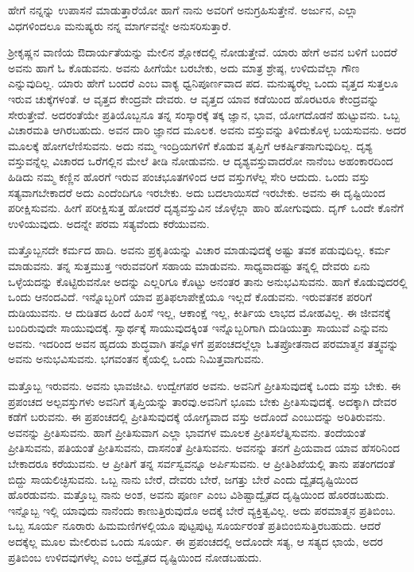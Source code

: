 \begin{artha}
ಹೇಗೆ ನನ್ನನ್ನು ಉಪಾಸನೆ ಮಾಡುತ್ತಾರೆಯೋ ಹಾಗೆ ನಾನು ಅವರಿಗೆ ಅನುಗ್ರಹಿಸುತ್ತೇನೆ. ಅರ್ಜುನ, ಎಲ್ಲಾ ವಿಧಗಳಿಂದಲೂ ಮನುಷ್ಯರು ನನ್ನ ಮಾರ್ಗವನ್ನೇ ಅನುಸರಿಸುತ್ತಾರೆ.
\end{artha}

ಶ‍್ರೀಕೃಷ್ಣನ ವಾಣಿಯ ಔದಾರ್ಯತೆಯನ್ನು ಮೇಲಿನ ಶ್ಲೋಕದಲ್ಲಿ ನೋಡುತ್ತೇವೆ. ಯಾರು ಹೇಗೆ ಅವನ ಬಳಿಗೆ ಬಂದರೆ ಅವನು ಹಾಗೆ ಓ ಕೊಡುವನು. ಅವನು ಹೀಗೆಯೇ ಬರಬೇಕು, ಅದು ಮಾತ್ರ ಶ್ರೇಷ್ಠ, ಉಳಿದುವೆಲ್ಲಾ ಗೌಣ ಎನ್ನುವುದಿಲ್ಲ. ಯಾರು ಹೇಗೆ ಬಂದರೆ ಎಂಬ ವಾಕ್ಯ ಧ್ವನಿಪೂರ್ಣವಾದ ಪದ. ಮನುಷ್ಯರೆಲ್ಲ ಒಂದು ವೃತ್ತದ ಸುತ್ತಲೂ ಇರುವ ಚುಕ್ಕೆಗಳಂತೆ. ಆ ವೃತ್ತದ ಕೇಂದ್ರವೇ ದೇವರು. ಆ ವೃತ್ತದ ಯಾವ ಕಡೆಯಿಂದ ಹೊರಟರೂ ಕೇಂದ್ರವನ್ನು ಸೇರುತ್ತೇವೆ. ಅದರಂತೆಯೇ ಪ್ರತಿಯೊಬ್ಬನೂ ತನ್ನ ಸಂಸ್ಕಾರಕ್ಕೆ ತಕ್ಕ ಜ್ಞಾನ, ಭಾವ, ಯೋಗದೊಡನೆ ಹುಟ್ಟುವನು. ಒಬ್ಬ ವಿಚಾರಮತಿ ಆಗಿರಬಹುದು. ಅವನ ದಾರಿ ಜ್ಞಾನದ ಮೂಲಕ. ಅವನು ವಸ್ತುವನ್ನು ತಿಳಿದುಕೊಳ್ಳ ಬಯಸುವನು. ಅದರ ಮೂಲಕ್ಕೆ ಹೋಗಲೆಣಿಸುವನು. ಅದು ನಮ್ಮ ಇಂದ್ರಿಯಗಳಿಗೆ ಕೊಡುವ ತೃಪ್ತಿಗೆ ಆಕರ್ಷಿತನಾಗುವುದಿಲ್ಲ. ದೃಶ್ಯ ವಸ್ತುವನ್ನೆಲ್ಲ ವಿಚಾರದ ಒರೆಗಲ್ಲಿನ ಮೇಲೆ ತೀಡಿ ನೋಡುವನು. ಆ ದೃಶ್ಯವಸ್ತುವಾದರೋ ನಾನೆಂಬ ಅಹಂಕಾರದಿಂದ ಹಿಡಿದು ನಮ್ಮ ಕಣ್ಣಿನ ಹೊರಗೆ ಇರುವ ಪಂಚಭೂತಗಳಿಂದ ಆದ ವಸ್ತುಗಳೆಲ್ಲ ಸೇರಿ ಆದುದು. ಒಂದು ವಸ್ತು ಸತ್ಯವಾಗಬೇಕಾದರೆ ಅದು ಎಂದೆಂದಿಗೂ ಇರಬೇಕು. ಅದು ಬದಲಾಯಿಸದೆ ಇರಬೇಕು. ಅವನು ಈ ದೃಷ್ಟಿಯಿಂದ ಪರೀಕ್ಷಿಸುವನು. ಹೀಗೆ ಪರೀಕ್ಷಿಸುತ್ತ ಹೋದರೆ ದೃಶ್ಯವಸ್ತುವಿನ ಜೊಳ್ಳೆಲ್ಲಾ ಹಾರಿ ಹೋಗುವುದು. ದೃಗ್ ಒಂದೇ ಕೊನೆಗೆ ಉಳಿಯುವುದು. ಅದನ್ನೇ ಪರಮ ಸತ್ಯವೆಂದು ಕರೆಯುವನು.

ಮತ್ತೊಬ್ಬನದೇ ಕರ್ಮದ ಹಾದಿ. ಅವನು ಪ್ರಕೃತಿಯನ್ನು ವಿಚಾರ ಮಾಡುವುದಕ್ಕೆ ಅಷ್ಟು ತವಕ ಪಡುವುದಿಲ್ಲ. ಕರ್ಮ ಮಾಡುವನು. ತನ್ನ ಸುತ್ತಮುತ್ತ ಇರುವವರಿಗೆ ಸಹಾಯ ಮಾಡುವನು. ಸಾಧ್ಯವಾದಷ್ಟು ತನ್ನಲ್ಲಿ ದೇವರು ಏನು ಒಳ್ಳೆಯದನ್ನು ಕೊಟ್ಟಿರುವನೋ ಅದನ್ನು ಎಲ್ಲರಿಗೂ ಕೊಟ್ಟು ಅನಂತರ ತಾನು ಅನುಭವಿಸುವನು. ಹಾಗೆ ಕೊಡುವುದರಲ್ಲಿ ಒಂದು ಆನಂದವಿದೆ. ಇನ್ನೊಬ್ಬರಿಗೆ ಯಾವ ಪ್ರತಿಫಲಾಪೇಕ್ಷೆಯೂ ಇಲ್ಲದೆ ಕೊಡುವನು. ಇರುವತನಕ ಪರರಿಗೆ ದುಡಿಯುವನು. ಆ ದುಡಿತದ ಹಿಂದೆ ಹಿಂಸೆ ಇಲ್ಲ, ಆಕಾಂಕ್ಷೆ ಇಲ್ಲ, ಕೀರ್ತಿಯ ಲಾಭದ ಮೋಹವಿಲ್ಲ. ಈ ಜೀವನಕ್ಕೆ ಬಂದಿರುವುದೇ ಸಾಯುವುದಕ್ಕೆ. ಸ್ವಾರ್ಥಕ್ಕೆ ಸಾಯುವುದಕ್ಕಿಂತ ಇನ್ನೊಬ್ಬರಿಗಾಗಿ ದುಡಿಯುತ್ತಾ ಸಾಯುವೆ ಎನ್ನುವನು ಅವನು. ಇದರಿಂದ ಅವನ ಹೃದಯ ಶುದ್ಧವಾಗಿ ತನ್ನೊಳಗೆ ಪ್ರಪಂಚದಲ್ಲೆಲ್ಲಾ ಓತಪ್ರೋತನಾದ ಪರಮಾತ್ಮನ ತತ್ತ್ವವನ್ನು ಅವನು ಅನುಭವಿಸುವನು. ಭಗವಂತನ ಕೈಯಲ್ಲಿ ಒಂದು ನಿಮಿತ್ತವಾಗುವನು.

ಮತ್ತೊಬ್ಬ ಇರುವನು. ಅವನು ಭಾವಜೀವಿ. ಉದ್ವೇಗಪರ ಅವನು. ಅವನಿಗೆ ಪ್ರೀತಿಸುವುದಕ್ಕೆ ಒಂದು ವಸ್ತು ಬೇಕು. ಈ ಪ್ರಪಂಚದ ಅಲ್ಪವಸ್ತುಗಳು ಅವನಿಗೆ ತೃಪ್ತಿಯನ್ನು ತಾರವು.\break ಅವನಿಗೆ ಭೂಮ ಬೇಕು ಪ್ರೀತಿಸುವುದಕ್ಕೆ. ಅದಕ್ಕಾಗಿ ದೇವರ ಕಡೆಗೆ ಬರುವನು. ಈ ಪ್ರಪಂಚದಲ್ಲಿ ಪ್ರೀತಿಸುವುದಕ್ಕೆ ಯೋಗ್ಯವಾದ ವಸ್ತು ಅದೊಂದೆ ಎಂಬುದನ್ನು ಅರಿತಿರುವನು. ಅವನನ್ನು ಪ್ರೀತಿಸುವನು. ಹಾಗೆ ಪ್ರೀತಿಸುವಾಗ ಎಲ್ಲಾ ಭಾವಗಳ ಮೂಲಕ ಪ್ರೀತಿಸಲೆತ್ನಿಸುವನು. ತಂದೆಯಂತೆ ಪ್ರೀತಿಸುವನು, ಪತಿಯಂತೆ ಪ್ರೀತಿಸುವನು, ದಾಸನಂತೆ ಪ್ರೀತಿಸುವನು. ಅವನನ್ನು ತನಗೆ ಪ್ರಿಯವಾದ ಯಾವ ಹೆಸರಿನಿಂದ ಬೇಕಾದರೂ ಕರೆಯುವನು. ಆ ಪ್ರೀತಿಗೆ ತನ್ನ ಸರ್ವಸ್ವವನ್ನೂ ಅರ್ಪಿಸುವನು. ಆ ಪ್ರೀತಿಶಿಖೆಯಲ್ಲಿ ತಾನು ಪತಂಗದಂತೆ ಬಿದ್ದು ಸಾಯಲಿಚ್ಛಿಸುವನು. ಒಬ್ಬ ನಾನು ಬೇರೆ, ದೇವರು ಬೇರೆ, ಜಗತ್ತು ಬೇರೆ ಎಂದು ದ್ವೈತದೃಷ್ಟಿಯಿಂದ ಹೊರಡುವನು. ಮತ್ತೊಬ್ಬ ನಾನು ಅಂಶ, ಅವನು ಪೂರ್ಣ ಎಂಬ ವಿಶಿಷ್ಟಾದ್ವೈತದ ದೃಷ್ಟಿಯಿಂದ ಹೊರಡಬಹುದು. ಇನ್ನೊಬ್ಬ ಇಲ್ಲಿ ಯಾವುದು ನಾನೆಂದು ಕಾಣುತ್ತಿರುವುದೊ ಅದಕ್ಕೆ ಬೇರೆ ವ್ಯಕ್ತಿತ್ವವಿಲ್ಲ. ಅದು ಪರಮಾತ್ಮನ ಪ್ರತಿಬಿಂಬ. ಒಬ್ಬ ಸೂರ್ಯ ನೂರಾರು ಹಿಮಮಣಿಗಳಲ್ಲಿಯೂ ಪುಟ್ಟಪುಟ್ಟ ಸೂರ್ಯರಂತೆ ಪ್ರತಿಬಿಂಬಿಸುತ್ತಿರಬಹುದು. ಆದರೆ ಅದಕ್ಕೆಲ್ಲ ಮೂಲ ಮೇಲಿರುವ ಒಂದು ಸೂರ್ಯ. ಈ ಪ್ರಪಂಚದಲ್ಲಿ ಅದೊಂದೇ ಸತ್ಯ, ಆ ಸತ್ಯದ ಛಾಯೆ, ಅದರ ಪ್ರತಿಬಿಂಬ ಉಳಿದವುಗಳೆಲ್ಲ ಎಂಬ ಅದ್ವೈತದ ದೃಷ್ಟಿಯಿಂದ ನೋಡಬಹುದು.

